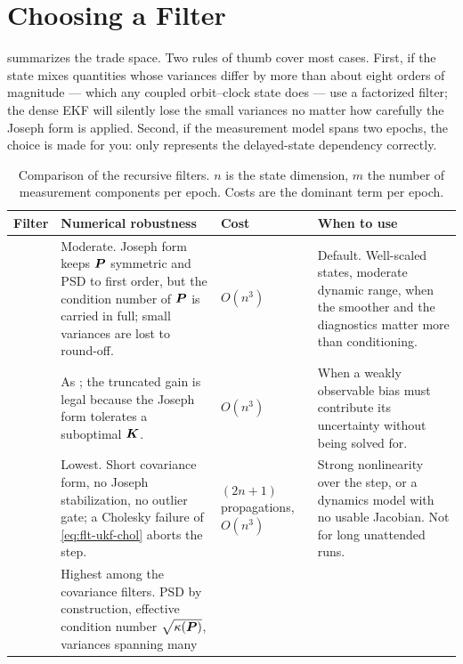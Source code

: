 \section{Choosing a Filter}
\label{sec:flt-choice}

 summarizes the trade space. Two rules of thumb cover
most cases. First, if the state mixes quantities whose variances differ by more
than about eight orders of magnitude --- which any coupled orbit--clock state
does --- use a factorized filter; the dense EKF will silently lose the small
variances no matter how carefully the Joseph form is applied. Second, if the
measurement model spans two epochs, the choice is made for you: only
 represents the delayed-state dependency
correctly.

\begin{table}[htbp]
  \centering
  \small
  \caption{Comparison of the recursive filters. $n$ is the state dimension,
           $m$ the number of measurement components per epoch. Costs are the
           dominant term per epoch.}
  \label{tab:flt-comparison}
  \begin{tabularx}{\textwidth}{LLLL}
    \toprule
    Filter & Numerical robustness & Cost & When to use \\
    \midrule
      & Moderate. Joseph form keeps $\bm{P}$ symmetric and PSD to first order,
        but the condition number of $\bm{P}$ is carried in full; small
        variances are lost to round-off.
      & $O(n^3)$
      & Default. Well-scaled states, moderate dynamic range, when the smoother
        and the diagnostics matter more than conditioning. \\
    \addlinespace
      & As ; the truncated gain is legal because the Joseph form
        tolerates a suboptimal $\bm{K}$.
      & $O(n^3)$
      & When a weakly observable bias must contribute its uncertainty without
        being solved for. \\
    \addlinespace
      & Lowest. Short covariance form, no Joseph stabilization, no outlier
        gate; a Cholesky failure of \cref{eq:flt-ukf-chol} aborts the step.
      & $(2n{+}1)$ propagations, $O(n^3)$
      & Strong nonlinearity over the step, or a dynamics model with no usable
        Jacobian. Not for long unattended runs. \\
    \addlinespace
      & Highest among the covariance filters. PSD by construction, effective
        condition number $\sqrt{\kappa(\bm{P})}$, variances spanning many

\end{tabularx}
\end{table}
